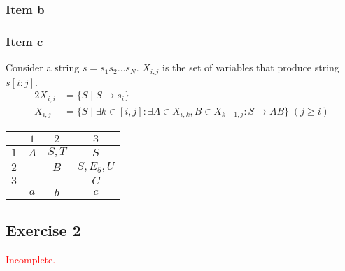 {\subsubsection{Item b}
\begin{center}
\end{center}
\subsubsection{Item c}
Consider a string $s=s_1s_2\ldots s_N$. $X_{i,j}$ is the set of variables that produce string $s[i:j]$.
\begin{alignat*}{2}
	X_{i,i} &= \{S\mid S \rightarrow s_i\}\\
	X_{i,j} &= \{S\mid \exists k \in [i,j] \colon \exists A\in X_{i,k},B\in X_{k+1,j}\colon S \rightarrow AB\}\;(j \geq i)
\end{alignat*}
\begin{center} \begin{tabular}{c || c | c | c}
	\backslashbox{$i$}{$j$} & $1             $ & $2             $ & $3      $ \\ \hline
	$1                    $ & $A             $ & $S, T          $ & $S      $ \\
    $2                    $ & \cellcolor{gray} & $B             $ & $S,E_5,U$ \\
	$3                    $ & \cellcolor{gray} & \cellcolor{gray} & $C      $ \\ \hline
	$                     $ & $a             $ & $b$     & $c$
\end{tabular} \end{center}
\subsection{Exercise 2}
\textcolor{red}{Incomplete.}
}